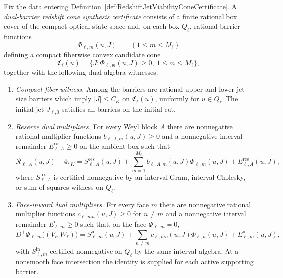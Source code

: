 \begin{definition}\label{def:DualBarrierRedshiftConeSynthesisCertificate}
Fix the data entering Definition~\ref{def:RedshiftJetViabilityConeCertificate}.
A \emph{dual-barrier redshift cone synthesis certificate} consists of a finite
rational box cover of the compact optical state space and, on each box
$Q_\ell$, rational barrier functions
\[
    \Phi_{\ell,m}(u,J)\qquad(1\le m\le M_\ell)
\]
defining a compact fiberwise convex candidate cone
\[
    \mathfrak C_\ell(u)
    =
    \{J:\Phi_{\ell,m}(u,J)\ge0,\ 1\le m\le M_\ell\},
\]
together with the following dual algebra witnesses.
\begin{enumerate}
    \item \emph{Compact fiber witness.}  Among the barriers are rational upper
    and lower jet-size barriers which imply $|J|\le C_K$ on
    $\mathfrak C_\ell(u)$, uniformly for $u\in Q_\ell$.  The initial jet
    $J_{\ell,0}$ satisfies all barriers on the initial cut.

    \item \emph{Reserve dual multipliers.}  For every Weyl block $A$ there are
    nonnegative rational multiplier functions
    $b_{\ell,A,m}(u,J)\ge0$ and a nonnegative interval remainder
    $E_{\ell,A}^{\mathrm{res}}\ge0$ on the ambient box such that
    \[
        \mathcal R_{\ell,A}(u,J)-4\tau_K
        =
        S_{\ell,A}^{\mathrm{res}}(u,J)
        +
        \sum_{m=1}^{M_\ell}
        b_{\ell,A,m}(u,J)\Phi_{\ell,m}(u,J)
        +
        E_{\ell,A}^{\mathrm{res}}(u,J),
    \]
    where $S_{\ell,A}^{\mathrm{res}}$ is certified nonnegative by an interval
    Gram, interval Cholesky, or sum-of-squares witness on $Q_\ell$.

    \item \emph{Face-inward dual multipliers.}  For every face $m$ there are
    nonnegative rational multiplier functions
    $c_{\ell,mn}(u,J)\ge0$ for $n\ne m$ and a nonnegative interval remainder
    $E_{\ell,m}^{\mathrm{in}}\ge0$ such that, on the face
    $\Phi_{\ell,m}=0$,
    \[
        D^+\Phi_{\ell,m}\bigl((V_\ell,W_\ell)\bigr)
        =
        S_{\ell,m}^{\mathrm{in}}(u,J)
        +
        \sum_{n\ne m}
        c_{\ell,mn}(u,J)\Phi_{\ell,n}(u,J)
        +
        E_{\ell,m}^{\mathrm{in}}(u,J),
    \]
    with $S_{\ell,m}^{\mathrm{in}}$ certified nonnegative on $Q_\ell$ by the
    same interval algebra.  At a nonsmooth face intersection the identity is
    supplied for each active supporting barrier.


\end{enumerate}
\end{definition}

